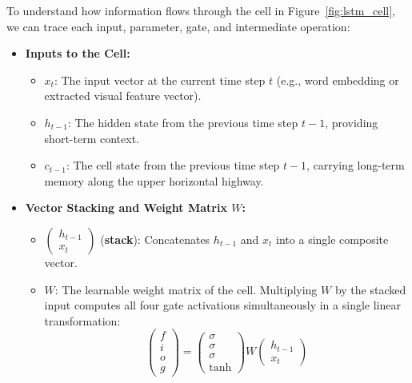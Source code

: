To understand how information flows through the cell in Figure~\ref{fig:lstm_cell}, we can trace each input, parameter, gate, and intermediate operation:

\begin{itemize}[leftmargin=*]
    \item \textbf{Inputs to the Cell:}
    \begin{itemize}[leftmargin=1.5em]
        \item $x_t$: The input vector at the current time step $t$ (e.g., word embedding or extracted visual feature vector).
        \item $h_{t-1}$: The hidden state from the previous time step $t-1$, providing short-term context.
        \item $c_{t-1}$: The cell state from the previous time step $t-1$, carrying long-term memory along the upper horizontal highway.
    \end{itemize}

    \item \textbf{Vector Stacking and Weight Matrix $W$:}
    \begin{itemize}[leftmargin=1.5em]
        \item $\begin{pmatrix} h_{t-1} \\ x_t \end{pmatrix}$ (\textbf{stack}): Concatenates $h_{t-1}$ and $x_t$ into a single composite vector.
        \item $W$: The learnable weight matrix of the cell. Multiplying $W$ by the stacked input computes all four gate activations simultaneously in a single linear transformation:
        \[
        \begin{pmatrix} f \\ i \\ o \\ g \end{pmatrix} = \begin{pmatrix} \sigma \\ \sigma \\ \sigma \\ \tanh \end{pmatrix} W \begin{pmatrix} h_{t-1} \\ x_t \end{pmatrix}
        \]
    \end{itemize}


\end{itemize}

